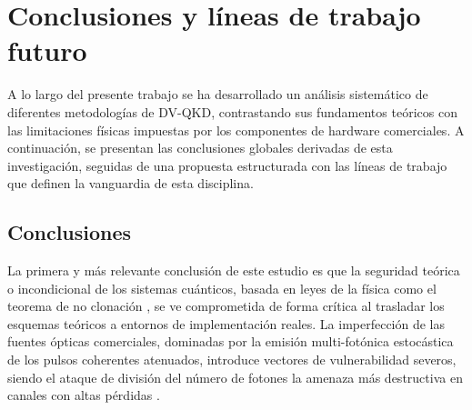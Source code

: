 \chapter{Conclusiones y líneas de trabajo futuro}

A lo largo del presente trabajo se ha desarrollado un análisis sistemático de diferentes metodologías de DV-QKD, contrastando sus fundamentos teóricos con las limitaciones físicas impuestas por los componentes de hardware comerciales. A continuación, se presentan las conclusiones globales derivadas de esta investigación, seguidas de una propuesta estructurada con las líneas de trabajo que definen la vanguardia de esta disciplina.

\section{Conclusiones}

La primera y más relevante conclusión de este estudio es que la seguridad teórica o incondicional de los sistemas cuánticos, basada en leyes de la física como el teorema de no clonación \citep{wootters1982}, se ve comprometida de forma crítica al trasladar los esquemas teóricos a entornos de implementación reales. La imperfección de las fuentes ópticas comerciales, dominadas por la emisión multi-fotónica estocástica de los pulsos coherentes atenuados, introduce vectores de vulnerabilidad severos, siendo el ataque de división del número de fotones la amenaza más destructiva en canales con altas pérdidas \citep{brassard2000pns, lutkenhaus2002}.

